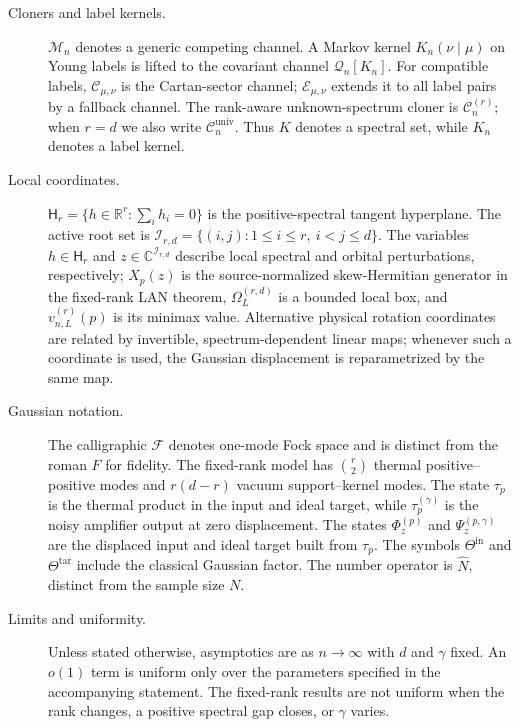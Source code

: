 \documentclass[11pt]{article}
\theoremstyle{remark}
\theoremstyle{plain}
\newcommand{\C}{\mathbb C}
\newcommand{\R}{\mathbb R}
\newcommand{\cC}{\mathcal C}
\newcommand{\cE}{\mathcal E}
\newcommand{\cF}{\mathcal F}
\newcommand{\cM}{\mathcal M}
\begin{document}
\begin{description}
\item[Cloners and label kernels.]
  \(\cM_n\) denotes a generic competing channel.  A Markov kernel
  \(K_n(\nu\mid\mu)\) on Young labels is lifted to the covariant channel
  \(\mathcal Q_n[K_n]\).  For compatible labels, \(\cC_{\mu,\nu}\) is the
  Cartan-sector channel; \(\cE_{\mu,\nu}\) extends it to all label pairs by
  a fallback channel.  The rank-aware unknown-spectrum cloner is
  \(\cC_n^{(r)}\); when \(r=d\) we also write
  \(\cC_n^{\mathrm{univ}}\).  Thus \(K\)
  denotes a spectral set, while \(K_n\) denotes a label kernel.

\item[Local coordinates.]
  \(\mathsf H_r=\{h\in\R^r:\sum_i h_i=0\}\) is the positive-spectral
  tangent hyperplane.  The active root set is
  \(\mathcal I_{r,d}=\{(i,j):1\le i\le r,\ i<j\le d\}\).
  The variables \(h\in\mathsf H_r\) and
  \(z\in\C^{\mathcal I_{r,d}}\) describe local spectral and orbital
  perturbations, respectively;
  \(X_p(z)\) is the source-normalized skew-Hermitian generator in the
  fixed-rank LAN theorem, \(\Omega_L^{(r,d)}\) is a bounded local box, and
  \(v_{n,L}^{(r)}(p)\) is its minimax value.  Alternative physical rotation
  coordinates are related by invertible, spectrum-dependent linear maps;
  whenever such a coordinate is used, the Gaussian displacement is
  reparametrized by the same map.

\item[Gaussian notation.]
  The calligraphic \(\cF\) denotes one-mode Fock space and is distinct from
  the roman \(F\) for fidelity.  The fixed-rank model has
  \(\binom r2\) thermal positive--positive modes and \(r(d-r)\) vacuum
  support--kernel modes.  The state \(\tau_p\) is the thermal product in the
  input and ideal target, while \(\tau_p^{(\gamma)}\) is the noisy amplifier
  output at zero displacement.  The states \(\Phi_z^{(p)}\) and
  \(\Psi_z^{(p,\gamma)}\) are the displaced input and ideal target built from
  \(\tau_p\).  The symbols \(\Theta^{\mathrm{in}}\) and
  \(\Theta^{\mathrm{tar}}\) include the classical Gaussian factor.  The
  number operator is \(\widehat N\), distinct from the sample size \(N\).

\item[Limits and uniformity.]
  Unless stated otherwise, asymptotics are as \(n\to\infty\) with \(d\) and
  \(\gamma\) fixed.  An \(o(1)\) term is uniform only over the parameters
  specified in the accompanying statement.  The fixed-rank results are not
  uniform when the rank changes, a positive spectral gap closes, or
  \(\gamma\) varies.
\end{description}
\end{document}
